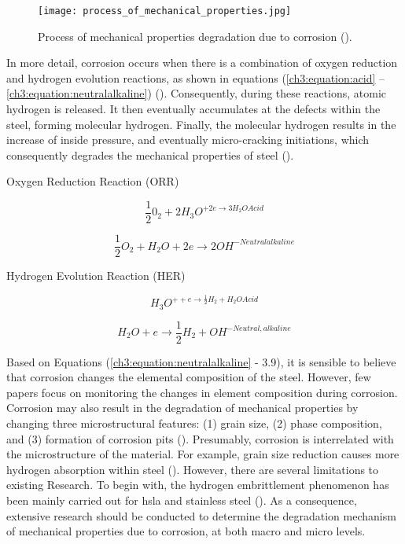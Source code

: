 \begin{figure}[H]
    \centering
    \texttt{[image: process\_of\_mechanical\_properties.jpg]}
    \caption{Process of mechanical properties degradation due to corrosion (\cite{protopopoff2011surface}).}
    \label{ch3:figure:degradation}
\end{figure}

In more detail, corrosion occurs when there is a combination of oxygen reduction and hydrogen evolution reactions, as shown in equations (\ref{ch3:equation:acid} – \ref{ch3:equation:neutralalkaline}) (\cite{li2018effect}).  Consequently, during these reactions, atomic hydrogen is released. It then eventually accumulates at the defects within the steel, forming molecular hydrogen. Finally, the molecular hydrogen results in the increase of inside pressure, and eventually micro-cracking initiations, which consequently degrades the mechanical properties of steel (\cite{whitman1924effect}).

Oxygen Reduction Reaction (ORR)

\begin{equation}
    \frac{1}{2}0_2 + 2H_3O^{+2e \rightarrow 3H_2OAcid}
    \label{ch3:equation:acid}
\end{equation}

\begin{equation}
    \frac{1}{2}O_2 + H_2O + 2e \rightarrow 2OH^{-Neutralalkaline}
\end{equation}

Hydrogen Evolution Reaction (HER)

\begin{equation}
    H_3O^{++e \rightarrow \frac{1}{2}H_2 + H_2OAcid}
\end{equation}

\begin{equation}
    H_2O + e \rightarrow \frac{1}{2}H_2 + OH^{-Neutral,alkaline}
    \label{ch3:equation:neutralalkaline}
\end{equation}

Based on Equations (\ref{ch3:equation:neutralalkaline} - 3.9), it is sensible to believe that corrosion changes the elemental composition of the steel. However, few papers focus on monitoring the changes in element composition during corrosion. Corrosion may also result in the degradation of mechanical properties by changing three microstructural features: (1) grain size, (2) phase composition, and (3) formation of corrosion pits (\cite{li2018effect}). Presumably, corrosion is interrelated with the microstructure of the material. For example, grain size reduction causes more hydrogen absorption within steel (\cite{li2018effect}). However, there are several limitations to existing Research. To begin with, the hydrogen embrittlement phenomenon has been mainly carried out for \acrfull{hsla} and stainless steel (\cite{li2018effect}). As a consequence, extensive research should be conducted to determine the degradation mechanism of mechanical properties due to corrosion, at both macro and micro levels.

